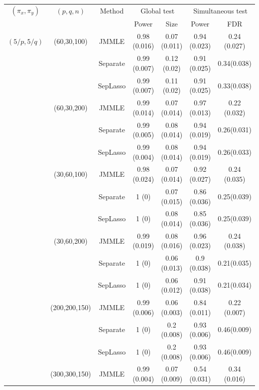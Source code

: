 \begin{table}[t!]
\centering
    \begin{tabular}{ccccccc}
\hline
$(\pi_x, \pi_y)$  & $(p,q,n)$ & Method & \multicolumn{2}{c}{Global test} & \multicolumn{2}{c}{Simultaneous test} \\\cline{4-7}
& & & Power         & Size           & Power           & FDR \\\hline
    $(5/p, 5/q)$ & (60,30,100) & JMMLE    & 0.98 (0.016)  & 0.07 (0.011)   & 0.94 (0.023)   &  0.24 (0.027) \\
    ~ & ~         & Separate & 0.99 (0.007)  & 0.12 (0.02)    & 0.91 (0.025)   & 0.34(0.038)   \\
    ~ & ~         & SepLasso & 0.99 (0.007)  & 0.11 (0.02)    & 0.91 (0.025)  & 0.33(0.038)     \\\cline{2-7}
    ~ & (60,30,200) & JMMLE    & 0.99 (0.014)  & 0.07 (0.014)   & 0.97  (0.013)   & 0.22 (0.032)  \\
    ~ & ~         & Separate & 0.99 (0.005)  & 0.08 (0.014)   & 0.94 (0.019)   & 0.26(0.031)   \\
    ~ & ~         & SepLasso & 0.99 (0.004)  & 0.08 (0.014)   & 0.94 (0.019)  & 0.26(0.033)     \\\cline{2-7}
    ~ & (30,60,100) & JMMLE    & 0.98 (0.024)  &  0.07 (0.014)  & 0.92  (0.027)   & 0.24 (0.035)  \\
    ~ & ~         & Separate &  1 (0)         & 0.07 (0.015)    & 0.86 (0.036)   & 0.25(0.039)   \\
    ~ & ~         & SepLasso &  1 (0)         & 0.08 (0.014)    & 0.85 (0.036)   & 0.25(0.039)   \\\cline{2-7}
    ~ & (30,60,200) & JMMLE    & 0.99 (0.019)  &  0.08 (0.016)  & 0.96 (0.023)   & 0.24 (0.038)  \\
    ~ & ~         & Separate & 1 (0)          & 0.06 (0.013)   & 0.9 (0.038)   & 0.21(0.035)   \\
    ~ & ~         & SepLasso & 1 (0)          & 0.06 (0.012)   & 0.91 (0.038) & 0.21(0.034)      \\\cline{2-7}
    ~ & (200,200,150) & JMMLE    & 0.99 (0.006)  & 0.06 (0.003)   & 0.84 (0.011)   & 0.22 (0.007)  \\
    ~ & ~         & Separate & 1 (0)          &  0.2 (0.008)  &  0.93 (0.006)  & 0.46(0.009)   \\
    ~ & ~         & SepLasso & 1 (0)          &  0.2 (0.008)  &  0.93 (0.006) & 0.46(0.009)   \\\cline{2-7}
    ~ & (300,300,150) & JMMLE    & 0.99 (0.004)  &  0.07 (0.009)  & 0.54  (0.031)   & 0.34 (0.016)  \\

\end{tabular}
\end{table}
